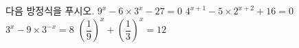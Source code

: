 다음 방정식을 푸시오.
 $9^x-6\times 3^x-27=0$
 $4^{x+1}-5\times 2^{x+2}+16=0$
 $3^x-9\times 3^{-x}=8$
 $\left(\dfrac{1}{9}\right)^{x}+\left(\dfrac{1}{3}\right)^{x}=12$
